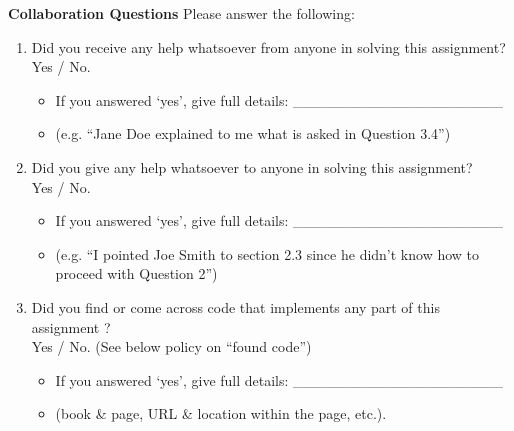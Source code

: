 \documentclass[12pt]{article}
\begin{document}
\clearpage


\begin{comment} 
{\bf Collaboration Questions} After you have completed all other components of this assignment, report your answers to the collaboration policy questions detailed in the Academic Integrity Policies found \href{http://www.cs.cmu.edu/~mgormley/courses/10601-s18/about.html#7-academic-integrity-policies}{here}.
    \begin{enumerate*}
        \item Did you receive any help whatsoever from anyone in solving this assignment? If so, include full details.
        \item Did you give any help whatsoever to anyone in solving this assignment? If so, include full details?
        \item Did you find or come across code that implements any part of this assignment ? If so, include full details.
    \end{enumerate*}
    
    \begin{tcolorbox}[fit,height=3cm,blank, borderline={1pt}{-2pt},nobeforeafter]
    \end{tcolorbox}
\end{comment}


\textbf{Collaboration Questions} Please answer the following:

\begin{enumerate}
    \item Did you receive any help whatsoever from anyone in solving this assignment? \\Yes / No.
    \begin{itemize}
        \item If you answered `yes', give full details: \_\_\_\_\_\_\_\_\_\_\_\_\_\_\_\_\_\_\_\_
        \item (e.g. “Jane Doe explained to me what is asked in Question 3.4”)
    \end{itemize}
    \item Did you give any help whatsoever to anyone in solving this assignment? \\Yes / No.
    \begin{itemize}
        \item If you answered `yes', give full details: \_\_\_\_\_\_\_\_\_\_\_\_\_\_\_\_\_\_\_\_
        \item (e.g. “I pointed Joe Smith to section 2.3 since he didn’t know how to proceed with Question 2”)
    \end{itemize}
    \item Did you find or come across code that implements any part of this assignment ? \\Yes / No. (See below policy on “found code”)
    \begin{itemize}
        \item If you answered `yes', give full details: \_\_\_\_\_\_\_\_\_\_\_\_\_\_\_\_\_\_\_\_
        \item (book \& page, URL \& location within the page, etc.).
    \end{itemize}
\end{enumerate}
\end{document}
